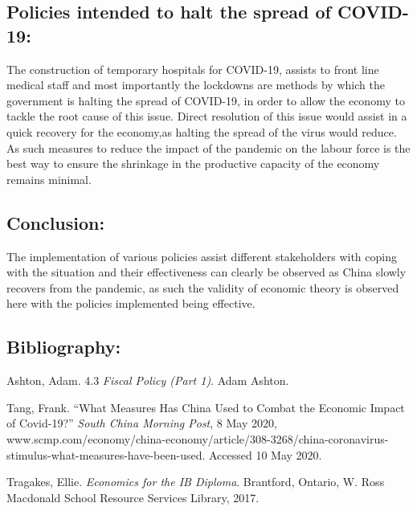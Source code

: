\documentclass[11pt, a4paper]{article}
\begin{document}
        \subsection{Policies intended to halt the spread of COVID-19:}
            The construction of temporary hospitals for COVID-19, assists to front line medical staff and most importantly the lockdowns are methods by which the government is halting the spread of COVID-19, in order to allow the economy to tackle the root cause of this issue. Direct resolution of this issue would assist in a quick recovery for the economy,as halting the spread of the virus would reduce. As such measures to reduce the impact of the pandemic on the labour force is the best way to ensure the shrinkage in the productive capacity of the economy remains minimal.
        \subsection{Conclusion:}
            The implementation of various policies assist different stakeholders with coping with the situation and their effectiveness can clearly be observed as China slowly recovers from the pandemic, as such the validity of economic theory is observed here with the policies implemented being effective.
        \subsection{Bibliography:}
        Ashton, Adam. 4.3 \textit{Fiscal Policy (Part 1)}. Adam Ashton.
        

        \hangindent=0.7cm
        \noindent
        Tang, Frank. “What Measures Has China Used to Combat the Economic Impact of Covid-19?” \textit{South China Morning Post}, 8 May 2020, www.scmp.com/economy/china-economy/article/308-3268/china-coronavirus-stimulus-what-measures-have-been-used. Accessed 10 May 2020.
        
        \hangindent=0.7cm
        \noindent
        Tragakes, Ellie. \textit{Economics for the IB Diploma}. Brantford, Ontario, W. Ross Macdonald School Resource Services Library, 2017.
        
        ‌
\end{document}
